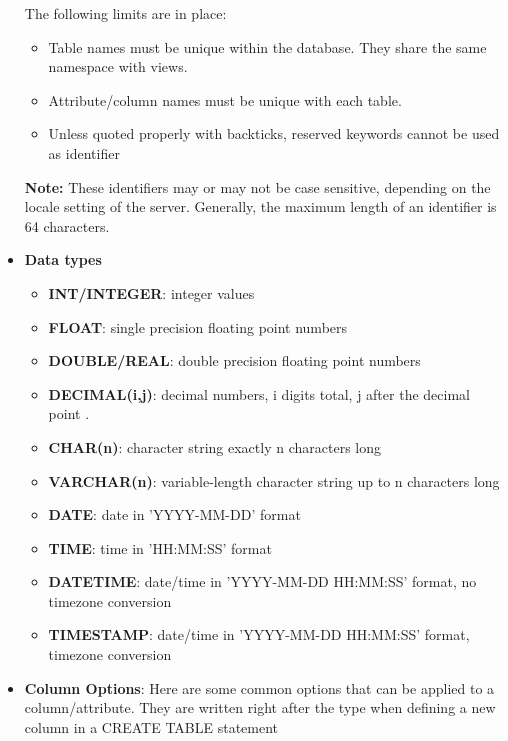 \documentclass{report}
\begin{document}
\begin{itemize}
            \bigbreak \noindent 
            The following limits are in place:
            \begin{itemize}
                \item Table names must be unique within the database. They share the same namespace with views.
                \item Attribute/column names must be unique with each table.
                \item Unless quoted properly with backticks, reserved keywords cannot be used as identifier
            \end{itemize}
            \bigbreak \noindent 
            \textbf{Note:} These identifiers may or may not be case sensitive, depending on the locale setting of the server.
            \bigbreak \noindent 
            Generally, the maximum length of an identifier is 64 characters.
        \item \textbf{Data types}
            \begin{itemize}
                \item \textbf{INT/INTEGER}: integer values
                \item \textbf{FLOAT}: single precision floating point numbers
                \item \textbf{DOUBLE/REAL}: double precision floating point numbers
                \item \textbf{DECIMAL(i,j)}: decimal numbers, i digits total, j after the decimal point .
                \item \textbf{CHAR(n)}: character string exactly n characters long
                \item \textbf{VARCHAR(n)}: variable-length character string up to n characters long
                \item \textbf{DATE}: date in 'YYYY-MM-DD' format
                \item \textbf{TIME}: time in 'HH:MM:SS' format
                \item \textbf{DATETIME}: date/time in 'YYYY-MM-DD HH:MM:SS' format, no timezone conversion
                \item \textbf{TIMESTAMP}: date/time in 'YYYY-MM-DD HH:MM:SS' format, timezone conversion
            \end{itemize}
        \item \textbf{Column Options}: Here are some common options that can be applied to a column/attribute. They are written right after the type when defining a new column in a CREATE TABLE statement

\end{itemize}
\end{document}

